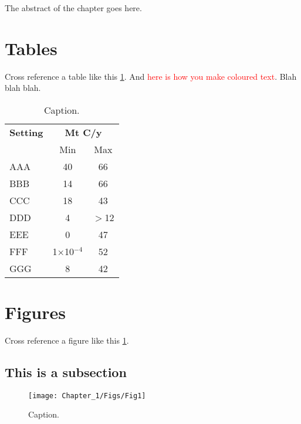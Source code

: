 \begin{chapabstract}

The abstract of the chapter goes here.

\end{chapabstract}

\section{Tables} %

Cross reference a table like this \ref{tab:Table1}.  And \textcolor{red}{here is how you make coloured text}. Blah blah blah.

\begin{table}[t]
\caption[TOC Table Description]{Caption.}
	\centering
	\begin{tabular}{lcc}
		\hline
        {\textbf{Setting}}                      & \multicolumn{2}{c}{\textbf{Mt C/y}} \\
		                                                           &         Min          &     Max      \\ \hline
		AAA                         &          40          &      66      \\
		BBB                               &          14          &      66      \\
		CCC                                       &          18          &      43      \\
		DDD      &          4           &    $>$12     \\
		EEE                                  &          0           &      47      \\
		FFF                    & 1$ \times $10$^{-4}$ &      52      \\
		GGG &          8           &      42      \\ \hline
	\end{tabular} 
    \label{tab:Table1}
\end{table}

\section{Figures} %
Cross reference a figure like this \ref{fig:Fig1}.

\subsection{This is a subsection} %
\begin{figure}[t]
	\centering
	\texttt{[image: Chapter\_1/Figs/Fig1]}
	\caption[TOC Figure Description]{Caption.}
	\label{fig:Fig1}
\end{figure}
